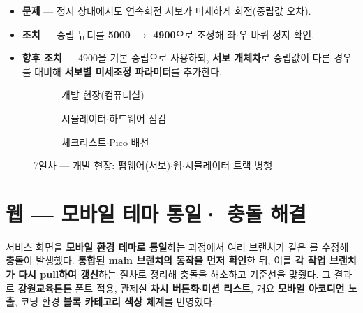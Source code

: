 \smallskip
\noindent{}  

\begin{itemize}
  \item \textbf{문제} — 정지 상태에서도 연속회전 서보가 미세하게 회전(중립값 오차).
  \item \textbf{조치} — 중립 듀티를 \textbf{5000 $\to$ 4900}으로 조정해 좌$\cdot$우 바퀴 정지 확인.
  \item \textbf{향후 조치} — 4900을 기본 중립으로 사용하되, \textbf{서보 개체차}로 중립값이 다른
  경우를 대비해 \textbf{서보별 미세조정 파라미터}를 추가한다.
\end{itemize}

\begin{figure}[htbp]\centering
  \begin{subfigure}{0.32\linewidth}\centering
    \caption{개발 현장(컴퓨터실)}
  \end{subfigure}\hfill
  \begin{subfigure}{0.32\linewidth}\centering
    \caption{시뮬레이터$\cdot$하드웨어 점검}
  \end{subfigure}\hfill
  \begin{subfigure}{0.32\linewidth}\centering
    \caption{체크리스트$\cdot$Pico 배선}
  \end{subfigure}
  \caption{7일차 — 개발 현장: 펌웨어(서보)$\cdot$웹$\cdot$시뮬레이터 트랙 병행}
\end{figure}

\section{웹 — 모바일 테마 통일· 충돌 해결}
서비스 화면을 \textbf{모바일 환경 테마로 통일}하는 과정에서 여러 브랜치가 같은 를
수정해 \textbf{충돌}이 발생했다. \textbf{통합된 main 브랜치의 동작을 먼저 확인}한 뒤, 이를
\textbf{각 작업 브랜치가 다시 pull하여 갱신}하는 절차로 정리해 충돌을 해소하고 기준선을
맞췄다. 그 결과로 \textbf{강원교육튼튼} 폰트 적용, 관제실 \textbf{차시 버튼화$\cdot$미션 리스트},
개요 \textbf{모바일 아코디언 노출}, 코딩 환경 \textbf{블록 카테고리 색상 체계}를 반영했다.

\smallskip
{}

